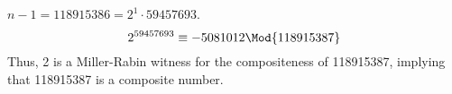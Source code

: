 \documentclass[
  coursecode={MTHE 418},
  assignmentname={Homework \homeworknumber},
  studentnumber=20053722,
  name={Bryan Hoang},
  draft,
]{
  ltxanswer%
}
\begin{document}
\begin{questions}
\begin{parts}
      \part{}
      \begin{solution}
        \(n - 1 = 118915386 = 2^{1} \cdot 59457693\).
        \begin{equation*}
          2^{59457693} \equiv -5081012 \Mod{118915387}
        \end{equation*}
        Thus, 2 is a Miller-Rabin witness for the compositeness of 118915387, implying that 118915387 is a composite number.
      \end{solution}
    \end{parts}
  \end{questions}
\end{document}
